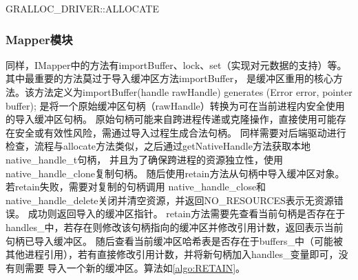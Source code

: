 \begin{algorithm}
  \caption{GRALLOC\_DRIVER::ALLOCATE}
  \label{algo:GRALLOC_DRIVER::ALLOCATE}
  \SetAlgoLined
  \end{algorithm}

\subsubsection{Mapper模块}
同样，IMapper中的方法有importBuffer、lock、set（实现对元数据的支持）等。其中最重要的方法莫过于导入缓冲区方法importBuffer，
是缓冲区重用的核心方法。该方法定义为importBuffer(handle rawHandle) generates (Error error, pointer buffer);
是将一个原始缓冲区句柄（rawHandle）转换为可在当前进程内安全使用的导入缓冲区句柄。
原始句柄可能来自跨进程传递或克隆操作，直接使用可能存在安全或有效性风险，需通过导入过程生成合法句柄。
同样需要对后端驱动进行检查，流程与allocate方法类似，之后通过getNativeHandle方法获取本地native\_handle\_t句柄，
并且为了确保跨进程的资源独立性，使用native\_handle\_clone复制句柄。
随后使用retain方法从句柄中导入缓冲区对象。若retain失败，需要对复制的句柄调用
native\_handle\_close和native\_handle\_delete关闭并清空资源，并返回NO\_RESOURCES表示无资源错误。
成功则返回导入的缓冲区指针。
retain方法需要先查看当前句柄是否存在于handles\_中，若存在则修改该句柄指向的缓冲区并修改引用计数，返回表示当前句柄已导入缓冲区。
随后查看当前缓冲区哈希表是否存在于buffers\_中（可能被其他进程引用），若有直接修改引用计数，并将新句柄加入handles\_变量即可，没有则需要
导入一个新的缓冲区。算法如\ref{algo:RETAIN}。


